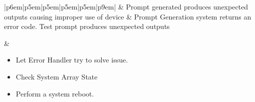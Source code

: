 \documentclass{article}
\begin{document}
\begin{table}[H]
\begin{tabular}{|p{6em}|p{5em}|p{5em}|p{5em}|p{5em}|p{9em}|}
			 & Prompt generated produces unexpected outputs causing improper use of device
			 & Prompt Generation system returns an error code. Test prompt produces unexpected outputs
	
			 & \begin{minipage}[t]{\linewidth}
				   \begin{itemize}[nosep, wide=0pt, leftmargin=*, after=\strut]
					\item Let Error Handler try to solve issue.
					\item Check System Array State
					\item Perform a system reboot.
				\end{itemize}
			   \end{minipage}  \tabularnewline{}
	
		\end{tabular}%
	\end{table}
		
\end{document}
